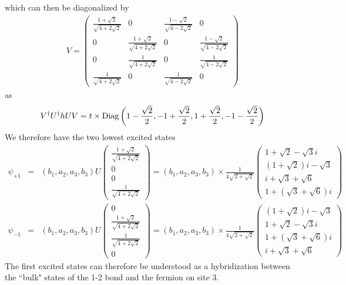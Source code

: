 which can then be diagonalized by
\begin{eqnarray}
	V = \begin{pmatrix}
		\frac{1+ \sqrt{2}}{\sqrt{4+2\sqrt{2}}} & 0 & \frac{1 - \sqrt{2}}{\sqrt{4-2\sqrt{2}}} & 0 \\
		0 & \frac{1 + \sqrt{2}}{\sqrt{4 + 2\sqrt{2}}} & 0 & \frac{1-\sqrt{2}}{\sqrt{4 - 2\sqrt{2}}} \\
		0 & \frac{1}{\sqrt{4+ 2\sqrt{2}}} & 0 & \frac{1}{\sqrt{4 - 2\sqrt{2}}} \\
		\frac{1}{\sqrt{4+2\sqrt{2}}} & 0 & \frac{1}{\sqrt{4-2\sqrt{2}}} & 0
	\end{pmatrix}
\end{eqnarray}
as
\begin{eqnarray}
	V^\dag U^\dag h U V =t\times {\rm Diag}\left( 1 -\frac{\sqrt{2}}{2},  -1 +\frac{\sqrt{2}}{2},  1 +\frac{\sqrt{2}}{2},  -1 -\frac{\sqrt{2}}{2} \right)
\end{eqnarray}
We therefore have the two lowest excited states
\begin{eqnarray}
	\psi_{+1} &=& (b_1,a_2,a_3,b_3) U \begin{pmatrix}
	\frac{1+ \sqrt{2}}{\sqrt{4+2\sqrt{2}}} \\
0  \\
0 \\
\frac{1}{\sqrt{4+2\sqrt{2}}}
	\end{pmatrix} = (b_1,a_2,a_3,b_3)\times \frac{1}{4\sqrt{2+\sqrt{2}}} \begin{pmatrix}
	1+\sqrt{2}-\sqrt{3} i \\
	(1+\sqrt{2})i-\sqrt{3}  \\
	i+ \sqrt{3} + \sqrt{6} \\
	1 + (\sqrt{3} + \sqrt{6})i
\end{pmatrix} \\\nonumber
	\psi_{-1} &=& (b_1,a_2,a_3,b_3) U \begin{pmatrix}
		0\\
	\frac{1+ \sqrt{2}}{\sqrt{4+2\sqrt{2}}} \\
	\frac{1}{\sqrt{4+2\sqrt{2}}} \\
	0
\end{pmatrix} = (b_1,a_2,a_3,b_3)\times \frac{1}{4\sqrt{2+\sqrt{2}}} \begin{pmatrix}
	(1+\sqrt{2})i-\sqrt{3} \\
	1+\sqrt{2}-\sqrt{3} i \\
	1+ (\sqrt{3} + \sqrt{6} )i\\
    i + \sqrt{3} + \sqrt{6}
\end{pmatrix}
\end{eqnarray}
The first excited states can therefore be understood as a hybridization between the ``bulk" states of the 1-2 bond and the fermion on site 3.

